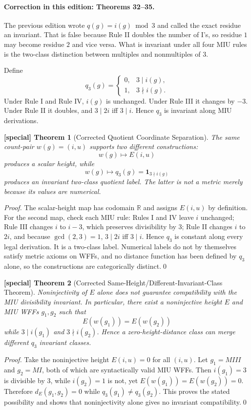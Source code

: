 \documentclass[11pt]{article}
\newtheorem{spthm}{[special] Theorem}
\begin{document}
\paragraph{Correction in this edition: Theorems 32--35.}
The previous edition wrote $q(g)=i(g)\bmod3$ and called the exact residue an invariant. That is false because Rule II doubles the number of I's, so residue $1$ may become residue $2$ and vice versa. What is invariant under all four MIU rules is the two-class distinction between multiples and nonmultiples of $3$.

Define
\[
q_3(g)=
\begin{cases}
0,&3\mid i(g),\\
1,&3\nmid i(g).
\end{cases}
\]
Under Rule I and Rule IV, $i(g)$ is unchanged. Under Rule III it changes by $-3$. Under Rule II it doubles, and $3\mid 2i$ iff $3\mid i$. Hence $q_3$ is invariant along MIU derivations.

\begin{spthm}[Corrected Quotient Coordinate Separation]
The same count-pair $w(g)=(i,u)$ supports two different constructions:
\[
w(g)\mapsto E(i,u)
\]
produces a scalar height, while
\[
w(g)\mapsto q_3(g)=\mathbf 1_{3\nmid i(g)}
\]
produces an invariant two-class quotient label. The latter is not a metric merely because its values are numerical.
\end{spthm}
\textit{Proof.} The scalar-height map has codomain $\mathbb R$ and assigns $E(i,u)$ by definition. For the second map, check each MIU rule: Rules I and IV leave $i$ unchanged; Rule III changes $i$ to $i-3$, which preserves divisibility by $3$; Rule II changes $i$ to $2i$, and because $\gcd(2,3)=1$, $3\mid2i$ iff $3\mid i$. Hence $q_3$ is constant along every legal derivation. It is a two-class label. Numerical labels do not by themselves satisfy metric axioms on WFFs, and no distance function has been defined by $q_3$ alone, so the constructions are categorically distinct.\qed


\begin{spthm}[Corrected Same-Height/Different-Invariant-Class Theorem]
Noninjectivity of $E$ alone does not guarantee compatibility with the MIU divisibility invariant. In particular, there exist a noninjective height $E$ and MIU WFFs $g_1,g_2$ such that
\[
E(w(g_1))=E(w(g_2))
\]
while $3\mid i(g_1)$ and $3\nmid i(g_2)$. Hence a zero-height-distance class can merge different $q_3$ invariant classes.
\end{spthm}
\textit{Proof.} Take the noninjective height $E(i,u)=0$ for all $(i,u)$. Let $g_1=MIII$ and $g_2=MI$, both of which are syntactically valid MIU WFFs. Then $i(g_1)=3$ is divisible by $3$, while $i(g_2)=1$ is not, yet $E(w(g_1))=E(w(g_2))=0$. Therefore $d_E(g_1,g_2)=0$ while $q_3(g_1)\ne q_3(g_2)$. This proves the stated possibility and shows that noninjectivity alone gives no invariant compatibility.\qed
\end{document}
